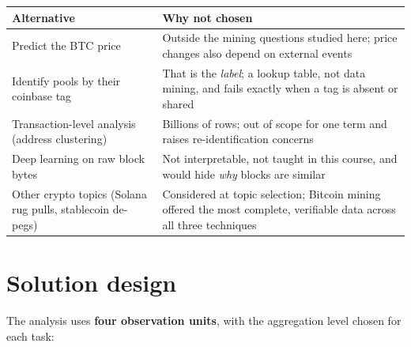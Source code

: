 \documentclass[
  11pt,
  a4paper,
]{article}
\newenvironment{reporttable}{\par\small\sffamily}{\par}
\begin{document}
\begin{reporttable}

\begin{longtable}[]{@{}
  >{\raggedright\arraybackslash}p{}
  >{\raggedright\arraybackslash}p{}@{}}
\toprule\noalign{}
\begin{minipage}[b]{\linewidth}\raggedright
\textbf{Alternative}
\end{minipage} & \begin{minipage}[b]{\linewidth}\raggedright
\textbf{Why not chosen}
\end{minipage} \\
\midrule\noalign{}
\endhead
\bottomrule\noalign{}
\endlastfoot
Predict the BTC price & Outside the mining questions studied here; price
changes also depend on external events \\
Identify pools by their coinbase tag & That is the \emph{label}; a
lookup table, not data mining, and fails exactly when a tag is absent or
shared \\
Transaction-level analysis (address clustering) & Billions of rows; out
of scope for one term and raises re-identification concerns \\
Deep learning on raw block bytes & Not interpretable, not taught in this
course, and would hide \emph{why} blocks are similar \\
Other crypto topics (Solana rug pulls, stablecoin de-pegs) & Considered
at topic selection; Bitcoin mining offered the most complete, verifiable
data across all three techniques \\
\end{longtable}

\end{reporttable}


\section{Solution design}\label{solution-design}

The analysis uses \textbf{four observation units}, with the aggregation
level chosen for each task:
\end{document}
